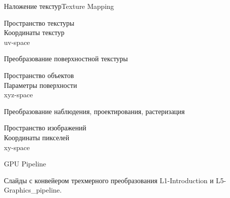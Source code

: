 \documentclass{beamer}
\begin{document}
	\begin{frame}{Наложение текстур}{Texture Mapping}

		Пространство текстуры \\
		Координаты текстур \\
		uv-space

		{\hfill
			Преобразование поверхностной текстуры
		}

		Пространство объектов \\
		Параметры поверхности \\
		xyz-space
		
		{\hfill
			Преобразование наблюдения, проектирования, растеризация
		}
		
		Пространство изображений \\
		Координаты пикселей \\
		xy-space
		

	\end{frame}

	\begin{frame}{GPU Pipeline}

		Слайды с конвейером трехмерного преобразования
		L1-Introduction и L5-Graphics\_pipeline.

	\end{frame}
\end{document}

